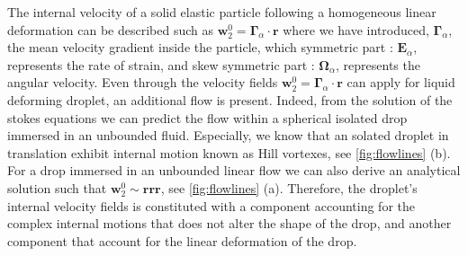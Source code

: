 The internal velocity of a solid elastic particle following a homogeneous linear deformation can be described such as $\textbf{w}_2^0 = \bm\Gamma_\alpha \cdot \textbf{r}$ where we have introduced, $\bm\Gamma_\alpha$, the mean velocity gradient inside the particle, which symmetric part : $\textbf{E}_\alpha$, represents the rate of strain, and skew symmetric part : $\bm\Omega_\alpha$, represents the angular velocity. 
Even through the velocity fields $\textbf{w}_2^0 = \bm\Gamma_\alpha \cdot \textbf{r}$  can apply for liquid deforming droplet, an additional flow is present. 
Indeed, from the solution of the stokes equations we can predict the flow within a spherical isolated drop immersed in an unbounded fluid. 
Especially, we know that an solated droplet in translation exhibit internal motion known as Hill vortexes, see \ref{fig:flowlines} (b). 
For a drop immersed in an unbounded linear flow we can also derive an analytical solution such that $\textbf{w}_2^0 \sim \textbf{rrr}$, see \ref{fig:flowlines} (a). 
Therefore, the droplet's internal velocity fields is constituted with a component accounting for the complex internal motions that does not alter the shape of the drop, and another component that account for the linear deformation of the drop.  
